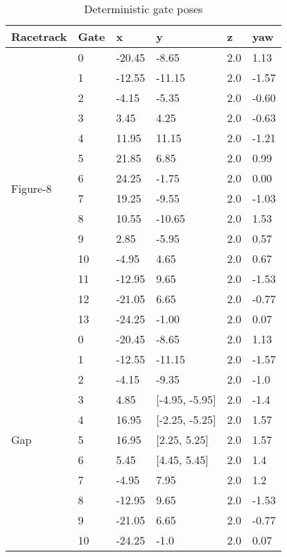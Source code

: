 \begin{table}[h]
    \footnotesize
    \caption{Deterministic gate poses\label{tab:gate_pos}}
    \centering
    \begin{tabular}{|l|l|l|l|l|l|}
    \hline
    Racetrack & Gate & x & y & z & yaw\\ 
    \hline
    \multirow{14}{*}{Figure-8}   
    &0 &-20.45& -8.65&2.0& 1.13\\ \cline{2-6}
    &1 &-12.55&-11.15&2.0&-1.57\\ \cline{2-6}
    &2 &-4.15 & -5.35&2.0&-0.60\\ \cline{2-6}
    &3 &3.45  &  4.25&2.0&-0.63\\ \cline{2-6}
    &4 &11.95 & 11.15&2.0&-1.21\\ \cline{2-6}
    &5 &21.85 &  6.85&2.0& 0.99\\ \cline{2-6}
    &6 &24.25 & -1.75&2.0& 0.00\\ \cline{2-6}
    &7 &19.25 & -9.55&2.0&-1.03\\ \cline{2-6}
    &8 &10.55 &-10.65&2.0& 1.53\\ \cline{2-6}
    &9 &2.85  & -5.95&2.0& 0.57\\ \cline{2-6}
    &10&-4.95 &  4.65&2.0& 0.67\\ \cline{2-6}
    &11&-12.95&  9.65&2.0&-1.53\\ \cline{2-6}
    &12&-21.05&  6.65&2.0&-0.77\\ \cline{2-6}
    &13&-24.25& -1.00&2.0& 0.07\\
    \hline
    \multirow{14}{*}{Gap}   
    &0 &-20.45&-8.65         &2.0& 1.13\\ \cline{2-6}
    &1 &-12.55&-11.15        &2.0&-1.57\\ \cline{2-6}
    &2 &-4.15 &-9.35         &2.0& -1.0\\ \cline{2-6}
    &3 &4.85  &[-4.95, -5.95]&2.0& -1.4\\ \cline{2-6}
    &4 &16.95 &[-2.25, -5.25]&2.0& 1.57\\ \cline{2-6}
    &5 &16.95 &[2.25,   5.25]&2.0& 1.57\\ \cline{2-6}
    &6 &5.45  &[4.45,   5.45]&2.0&  1.4\\ \cline{2-6}
    &7 &-4.95 &7.95          &2.0&  1.2\\ \cline{2-6}
    &8 &-12.95&9.65          &2.0&-1.53\\ \cline{2-6}
    &9 &-21.05&6.65          &2.0&-0.77\\ \cline{2-6}
    &10&-24.25&-1.0          &2.0& 0.07\\
    \hline
    \end{tabular}
\end{table}






